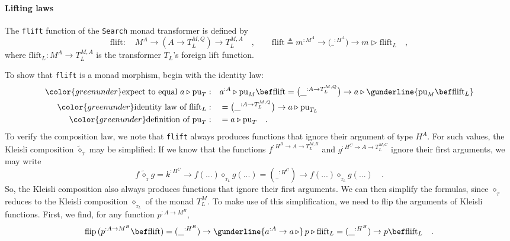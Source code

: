 \paragraph{Lifting laws}

The \lstinline!flift! function of the \lstinline!Search! monad transformer
is defined by
\[
\text{flift}:\quad M^{A}\rightarrow(A\rightarrow T_{L}^{M,Q})\rightarrow T_{L}^{M,A}\quad,\quad\quad\text{flift}\triangleq m^{:M^{A}}\rightarrow\big(\_^{:H^{A}}\big)\rightarrow m\triangleright\text{flift}_{L}\quad,
\]
where $\text{flift}_{L}:M^{A}\rightarrow T_{L}^{M,A}$ is the transformer
$T_{L}$\textsf{'}s foreign lift function.

To show that \lstinline!flift! is a monad morphism, begin with the
identity law:
\begin{align*}
{\color{greenunder}\text{expect to equal }a\triangleright\text{pu}_{T}:}\quad & a^{:A}\triangleright\text{pu}_{M}\bef\text{flift}=\big(\_^{:A\rightarrow T_{L}^{M,Q}}\big)\rightarrow a\triangleright\gunderline{\text{pu}_{M}\bef\text{flift}_{L}}\\
{\color{greenunder}\text{identity law of }\text{flift}_{L}:}\quad & =\big(\_^{:A\rightarrow T_{L}^{M,Q}}\big)\rightarrow a\triangleright\text{pu}_{T_{L}}\\
{\color{greenunder}\text{definition of }\text{pu}_{T}:}\quad & =a\triangleright\text{pu}_{T}\quad.
\end{align*}
To verify the composition law, we note that \lstinline!flift! always
produces functions that ignore their argument of type $H^{A}$. For
such values, the Kleisli composition $\tilde{\diamond}_{_{T}}$ may
be simplified: If we know that the functions $f^{:H^{B}\rightarrow A\rightarrow T_{L}^{M,B}}$
and $g^{:H^{C}\rightarrow A\rightarrow T_{L}^{M,C}}$ ignore their
first arguments, we may write
\[
f\,\tilde{\diamond}_{_{T}}g=k^{:H^{C}}\rightarrow f(...)\diamond_{_{T_{L}}}g(...)=(\_^{:H^{C}})\rightarrow f(...)\diamond_{_{T_{L}}}g(...)\quad.
\]
So, the Kleisli composition also always produces functions that ignore
their first arguments. We can then simplify the formulas, since $\diamond_{_{T}}$
reduces to the Kleisli composition $\diamond_{_{T_{L}}}$ of the monad
$T_{L}^{M}$. To make use of this simplification, we need to flip
the arguments of Kleisli functions. First, we find, for any function
$p^{:A\rightarrow M^{B}}$,
\[
\text{flip}\,(p^{:A\rightarrow M^{B}}\bef\text{flift})=(\_^{:H^{B}})\rightarrow\gunderline{a^{:A}\rightarrow a\,\triangleright}\,p\triangleright\text{flift}_{L}=(\_^{:H^{B}})\rightarrow p\bef\text{flift}_{L}\quad.
\]
